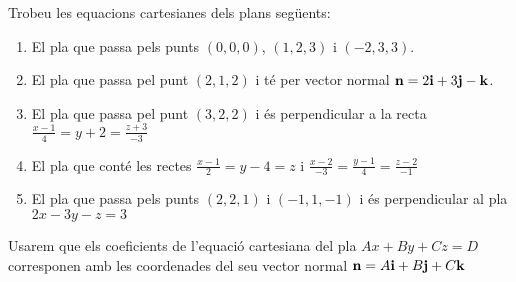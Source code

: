 \Exercise Trobeu les equacions cartesianes dels plans següents:
\begin{enumerate}
  \item El pla que passa pels punts $(0,0,0)$, $(1,2,3)$ i $(-2,3,3)$.
  \item El pla que passa pel punt $(2,1,2)$ i té per vector normal $\textbf{n}=2\textbf{i}+3\textbf{j}-\textbf{k}$.
  \item El pla que passa pel punt $(3,2,2)$ i és perpendicular a la recta $\frac{x-1}{4}=y+2=\frac{z+3}{-3}$
  \item El pla que conté les rectes $\frac{x-1}{2}=y-4=z$ i $\frac{x-2}{-3}=\frac{y-1}{4}=\frac{z-2}{-1}$
  \item El pla que passa pels punts $(2,2,1)$ i $(-1,1,-1)$ i és perpendicular al pla $2x-3y-z=3$
\end{enumerate}
 
\Answer Usarem que els coeficients de l'equació cartesiana del pla $Ax+By+Cz=D$ corresponen amb les coordenades del seu vector normal $\textbf{n}=A\textbf{i}+B\textbf{j}+C\textbf{k}$

